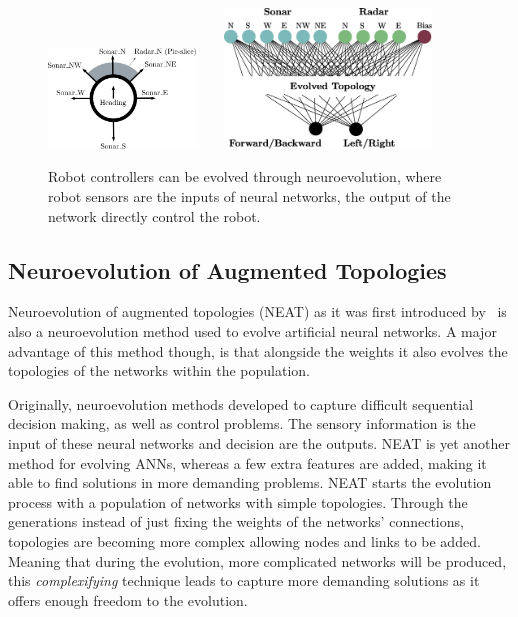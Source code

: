 \begin{figure}[t!]
\centering
\includegraphics[width=0.35\textwidth]{../Figures/Misc/RobotMaze.eps}\  \    \  \    
\includegraphics[width=0.49\textwidth]{../Figures/Misc/RobotMazeNetwork.eps}
\caption{Robot controllers can be evolved through neuroevolution, where robot sensors are the inputs of neural networks, the output of the network directly control the robot.}
\label{fig:robotExample}
\end{figure}


\subsection{Neuroevolution of Augmented Topologies}
\label{NEAT}

Neuroevolution of augmented topologies (NEAT) as it was first introduced by~\citep{stanley2002evolving} is also a neuroevolution method used to evolve artificial neural networks. A major advantage of this method though, is that alongside the weights it also evolves the topologies of the networks within the population.

Originally, neuroevolution methods developed to capture difficult sequential decision making, as well as control problems. The sensory information is the input of these neural networks and decision are the outputs. NEAT is yet another method for evolving ANNs, whereas a few extra features are added, making it able to find solutions in more demanding problems. NEAT starts the evolution process with a population of networks with simple topologies. Through the generations instead of just fixing the weights of the networks' connections, topologies are becoming more complex allowing nodes and links to be added. Meaning that during the evolution, more complicated networks will be produced, this \emph{complexifying} technique leads to capture more demanding solutions as it offers enough freedom to the evolution.

